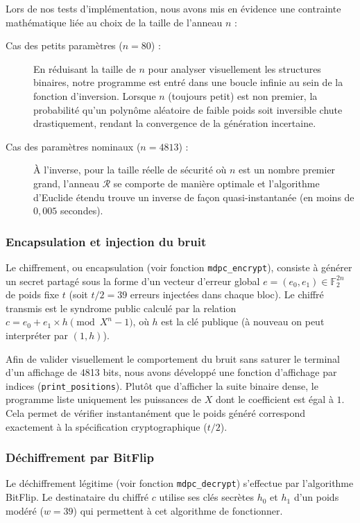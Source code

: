 \documentclass[11pt,a4paper]{article}
\begin{document}
Lors de nos tests d'implémentation, nous avons mis en évidence une contrainte
mathématique liée au choix de la taille de l'anneau $n$ :
\begin{description}
    \item[Cas des petits paramètres ($n=80$) :] En réduisant la taille de $n$
    pour analyser visuellement les structures binaires, notre programme est
    entré dans une boucle infinie au sein de la fonction d'inversion. Lorsque
    $n$ (toujours petit) est non premier, la probabilité qu'un polynôme
    aléatoire de faible poids soit inversible chute drastiquement, rendant la
    convergence de la génération incertaine.
    \item[Cas des paramètres nominaux ($n=4813$) :] À l'inverse, pour la taille
    réelle de sécurité où $n$ est un nombre premier grand, l'anneau
    $\mathcal{R}$ se comporte de manière optimale et l'algorithme d'Euclide
    étendu trouve un inverse de façon quasi-instantanée (en moins de $0,005$
    secondes).
\end{description}

\subsubsection{Encapsulation et injection du bruit}

Le chiffrement, ou encapsulation (voir fonction \texttt{mdpc\_encrypt}), consiste
à générer un secret partagé sous la forme d'un vecteur d'erreur global $e =
(e_0, e_1) \in \mathbb{F}_2^{2n}$ de poids fixe $t$ (soit $t/2 = 39$ erreurs
injectées dans chaque bloc). Le chiffré transmis est le syndrome public calculé
par la relation $c = e_0 + e_1 \times h \pmod{X^n-1}$, où $h$ est la clé
publique (à nouveau on peut interpréter par $(1, h)$).

Afin de valider visuellement le comportement du bruit sans saturer le terminal
d'un affichage de 4813 bits, nous avons développé une fonction d'affichage par
indices (\texttt{print\_positions}). Plutôt que d'afficher la suite binaire
dense, le programme liste uniquement les puissances de $X$ dont le coefficient
est égal à $1$. Cela permet de vérifier instantanément que le poids généré
correspond exactement à la spécification cryptographique ($t/2$).

\subsubsection{Déchiffrement par BitFlip}

Le déchiffrement légitime (voir fonction \texttt{mdpc\_decrypt}) s'effectue par
l'algorithme BitFlip. Le destinataire du chiffré $c$ utilise ses clés secrètes
$h_0$ et $h_1$ d'un poids modéré ($w = 39$) qui permettent à cet algorithme de
fonctionner.
\end{document}

